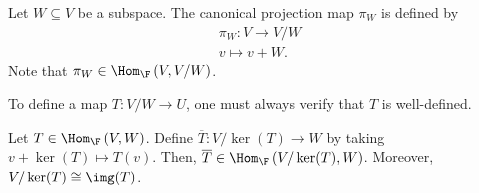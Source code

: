 \documentclass[10pt]{mypackage}
\begin{document}
\begin{definition}
  Let $W\subseteq V$ be a subspace. The canonical projection map $\pi_W$ is defined by
  \begin{align*}
    \pi_W: V\rightarrow V/W\\
    v\mapsto v + W.
  \end{align*}
  Note that $\pi_W\in \Hom_{\F}\left(V,V/W\right)$.
\end{definition}
\begin{remark}
  To define a map $T: V/W\rightarrow U$, one must always verify that $T$ is well-defined.
\end{remark}
\begin{theorem}
  Let $T\in\Hom_{\F}\left(V,W\right)$. Define $\overline{T}: V/\ker(T)\rightarrow W$ by taking $v + \ker(T) \mapsto T(v)$. Then, $\overline{T}\in \Hom_{\F}\left(V/\ker(T),W\right)$. Moreover, $V/\ker(T)\cong \img(T)$.
\end{theorem}
\end{document}
